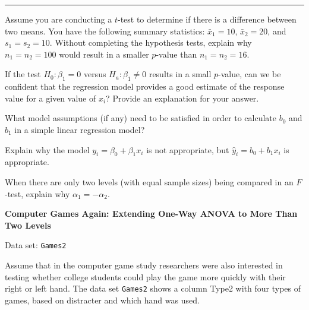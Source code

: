 \documentclass[
]{report}
\begin{document}
\vspace{-2em}

\noindent

\rule{\linewidth}{0.4pt}

\renewcommand{\theexcountlr}{E.\arabic{excountlr}}

\begin{list}{E..}{ \setlength{\itemsep}{1.2em}}

  \item Assume you are conducting a $t$-test to determine if there is a difference between two means. You have the following summary statistics: $\bar{x}_1 = 10$, $\bar{x}_2 = 20$, and $s_1 = s_2 = 10$. Without completing the hypothesis tests, explain why $n_1 = n_2 = 100$ would result in a smaller $p$-value than $n_1 = n_2 = 16$.

  \item If the test $H_0\colon \beta_1 = 0$ versus $H_a\colon \beta_1 \ne 0$ results in a small $p$-value, can we be confident that the regression model provides a good estimate of the response value for a given value of $x_i$? Provide an explanation for your answer.

  \item What model assumptions (if any) need to be satisfied in order to calculate $b_0$ and $b_1$ in a simple linear regression model?

  \item Explain why the model $y_i = \beta_0 + \beta_1 x_i$ is not appropriate, but $\hat{y}_i = b_0 + b_1 x_i$ is appropriate.

  \item When there are only two levels (with equal sample sizes) being compared in an $F$-test, explain why $\alpha_1 = -\alpha_2$.

  \item \textbf{Computer Games Again: Extending One-Way ANOVA to More Than Two Levels}

Data set: \texttt{Games2}

Assume that in the computer game study researchers were also interested in testing whether college students could play the game more quickly with their right or left hand. The data set \texttt{Games2} shows a column Type2 with four types of games, based on distracter and which hand was used.


\end{list}
\end{document}
